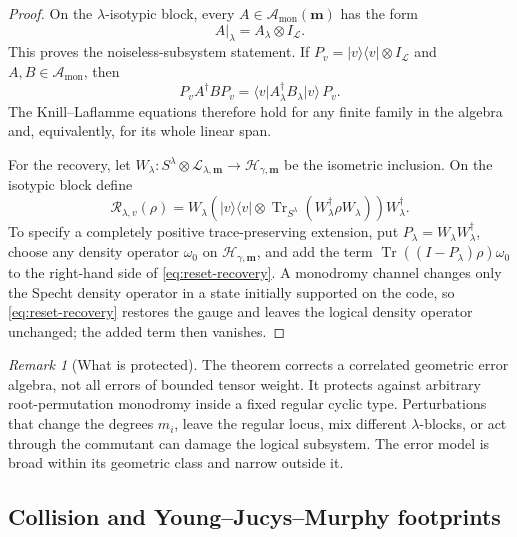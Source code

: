 \documentclass[11pt]{article}
\theoremstyle{definition}
\theoremstyle{remark}
\newtheorem{remark}[theorem]{Remark}
\newcommand{\cH}{\mathcal H}
\newcommand{\cA}{\mathcal A}
\newcommand{\cR}{\mathcal R}
\newcommand{\cL}{\mathcal L}
\newcommand{\Tr}{\operatorname{Tr}}
\newcommand{\ket}[1]{\lvert #1\rangle}
\newcommand{\bra}[1]{\langle #1\rvert}
\newcommand{\proj}[1]{\lvert #1\rangle\!\langle #1\rvert}
\begin{document}
\begin{proof}
On the $\lambda$-isotypic block, every $A\in\cA_{\mathrm{mon}}(\boldsymbol m)$ has the form
\begin{equation}\label{eq:monodromy-block}
 A\big|_\lambda=A_\lambda\otimes I_{\cL}.
\end{equation}
This proves the noiseless-subsystem statement.  If $P_v=\proj{v}\otimes I_{\cL}$ and $A,B\in\cA_{\mathrm{mon}}$, then
\[
 P_vA^\dagger BP_v
 =\bra{v}A_\lambda^\dagger B_\lambda\ket{v}\,P_v.
\]
The Knill--Laflamme equations therefore hold for any finite family in the algebra and, equivalently, for its whole linear span.

For the recovery, let $W_\lambda:S^\lambda\otimes\cL_{\lambda,\boldsymbol m}\to\cH_{\gamma,\boldsymbol m}$ be the isometric inclusion.  On the isotypic block define
\begin{equation}\label{eq:reset-recovery}
 \cR_{\lambda,v}(\rho)
 =W_\lambda\left(
   \proj{v}\otimes
   \Tr_{S^\lambda}(W_\lambda^\dagger\rho W_\lambda)
   \right)W_\lambda^\dagger.
\end{equation}
To specify a completely positive trace-preserving extension, put
$P_\lambda=W_\lambda W_\lambda^\dagger$, choose any density operator
$\omega_0$ on $\cH_{\gamma,\boldsymbol m}$, and add the term
$\Tr((I-P_\lambda)\rho)\omega_0$ to the right-hand side of
\eqref{eq:reset-recovery}.  A monodromy channel changes only the Specht
density operator in a state initially supported on the code, so
\eqref{eq:reset-recovery} restores the gauge and leaves the logical density
operator unchanged; the added term then vanishes.
\end{proof}

\begin{remark}[What is protected]\label{rem:error-scope}
The theorem corrects a correlated geometric error algebra, not all errors of bounded tensor weight.  It protects against arbitrary root-permutation monodromy inside a fixed regular cyclic type.  Perturbations that change the degrees $m_i$, leave the regular locus, mix different $\lambda$-blocks, or act through the commutant can damage the logical subsystem.  The error model is broad within its geometric class and narrow outside it.
\end{remark}

\subsection{Collision and Young--Jucys--Murphy footprints}
\end{document}
